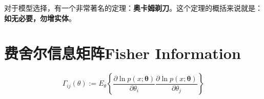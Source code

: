 对于模型选择，有一个非常著名的定理：\textbf{奥卡姆剃刀}。这个定理的概括来说就是：\textbf{如无必要，勿增实体}。
\section{费舍尔信息矩阵Fisher Information}

\begin{equation}
    \Gamma_{ij}(\theta):=E_{\theta}\left\{ \frac{\partial \ln p(x;\boldsymbol{\theta})}{\partial \theta_i} \frac{\partial \ln p(x;\boldsymbol{\theta})}{\partial \theta_j} \right\}
\end{equation}